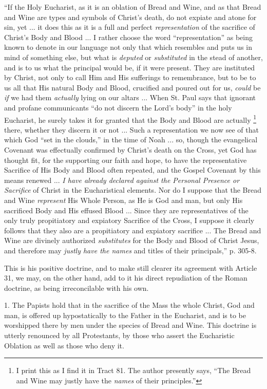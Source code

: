 ``If the Holy Eucharist, as it is an oblation of Bread and
Wine, and as that Bread and Wine are types and symbols of Christ's
death, do not expiate and atone for sin, yet ... it does this as it is
a full and perfect \emph{representation} of the sacrifice of Christ's
Body and Blood ... I rather choose the word ``representation''
as being known to denote in our language not only that which resembles
and puts us in mind of something else, but what is \emph{deputed} or \emph{substituted}
in the stead of another, and is to us what the principal would be, if
it were present. They are instituted by Christ, not only to call Him
and His sufferings to remembrance, but to be to us all that His
natural Body and Blood, crucified and poured out for us, \emph{could}
be \emph{if} we had them \emph{actually} lying on our altars ... When
St. Paul says that ignorant and profane communicants ``do not
discern the Lord's body'' in the holy Eucharist, he surely takes
it for granted that the Body and Blood are actually \footnote{I print this as I find it in Tract 81. The
author presently says, ``The Bread and Wine may justly have the \emph{names}
of their principles.''} there, whether they discern it or not ... Such a
representation we now see of that which God ``set in the
clouds,'' in the time of Noah ... so, though the evangelical
Covenant was effectually confirmed by Christ's death on the Cross, yet
God has thought fit, for the supporting our faith and hope, to have
the representative Sacrifice of His Body and Blood often repeated, and
the Gospel Covenant by this means renewed ... \emph{I have already
declared against the Personal Presence or Sacrifice} of Christ in
the Eucharistical elements. Nor do I suppose that the Bread and Wine \emph{represent}
His Whole Person, as He is God and man, but only His sacrificed Body
and His effused Blood ... Since they are representatives of the only
truly propitiatory and expiatory Sacrifice of the Cross, I suppose it
clearly follows that they also are a propitiatory and expiatory
sacrifice ... The Bread and Wine are divinely authorized \emph{substitutes}
for the Body and Blood of Christ Jesus, and therefore may \emph{justly
have the names} and titles of their principals,'' p. 305-8.

This is his positive doctrine, and to make still clearer its
agreement with Article 31, we may, on the other hand, add to it his
direct repudiation of the Roman doctrine, as being irreconcilable with
his own.

1. The Papists hold that in the sacrifice of the Mass the whole
Christ, God and man, is offered up hypostatically to the Father in the
Eucharist, and is to be worshipped there by men under the species of
Bread and Wine. This doctrine is utterly renounced by all Protestants,
by those who assert the Eucharistic Oblation as well as those who deny
it.

